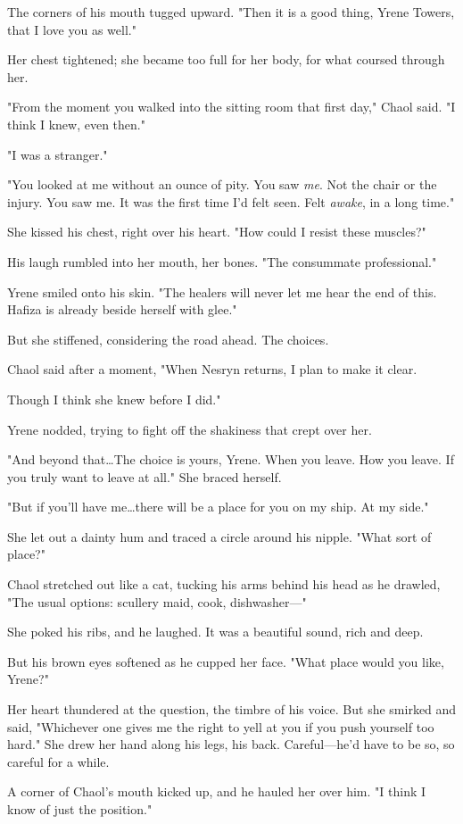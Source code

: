 The corners of his mouth tugged upward.
"Then it is a good thing, Yrene Towers, that I love you as well."

Her chest tightened; she became too full for her body, for what coursed through her.

"From the moment you walked into the sitting room that first day," Chaol said.
"I think I knew, even then."

"I was a stranger."

"You looked at me without an ounce of pity.
You saw \emph{me}.
Not the chair or the injury.
You saw me.
It was the first time I'd felt 
seen.
Felt \emph{awake}, in a long time."

She kissed his chest, right over his heart.
"How could I resist these muscles?"

His laugh rumbled into her mouth, her bones.
"The consummate professional."

Yrene smiled onto his skin.
"The healers will never let me hear the end of this.
Hafiza is already beside herself with glee."

But she stiffened, considering the road ahead.
The choices.

Chaol said after a moment, "When Nesryn returns, I plan to make it clear.

Though I think she knew before I did."

Yrene nodded, trying to fight off the shakiness that crept over her.

"And beyond that\ldots The choice is yours, Yrene.
When you leave.
How you leave.
If you truly want to leave at all."
She braced herself.

"But if you'll have me\ldots there will be a place for you on my ship.
At my side."

She let out a dainty hum and traced a circle around his nipple.
"What sort of place?"

Chaol stretched out like a cat, tucking his arms behind his head as he drawled, "The usual options: scullery maid, cook, dishwasher---"

She poked his ribs, and he laughed.
It was a beautiful sound, rich and deep.

But his brown eyes softened as he cupped her face.
"What place would you like, Yrene?"

Her heart thundered at the question, the timbre of his voice.
But she smirked and said, "Whichever one gives me the right to yell at you if you push yourself too hard."
She drew her hand along his legs, his back.
Careful---he'd have to be so, so careful for a while.

A corner of Chaol's mouth kicked up, and he hauled her over him.
"I think I know of just the position."

